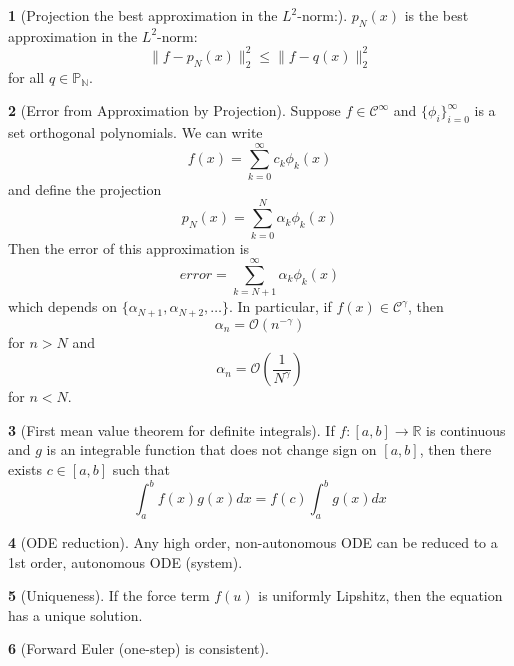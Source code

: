 \documentclass[12pt]{article}
\theoremstyle{definition}
\newtheorem{theorem}{\color{ForestGreen}{\textbf{Theorem}}}
\newcommand{\R}{\mathbb{R}}
\newcommand{\norm}[1]{\lVert#1\rVert}
\begin{document}
\begin{theorem}[Projection the best approximation in the $L^2$-norm:]
$p_N(x)$ is the best approximation in the $L^2$-norm:
\begin{equation}
\norm{f-p_N(x)}^2_2 \leq \norm{f-q(x)}^2_2
\end{equation}
for all $q \in \mathbb{P_N}$.
\end{theorem}

\begin{theorem}[Error from Approximation by Projection]
Suppose $f \in \mathcal{C}^\infty$ and $\{\phi_i\}_{i=0}^{\infty}$ is a set orthogonal polynomials. We can write
\begin{equation}
f(x) = \sum_{k=0}^\infty c_k \phi_k(x)
\end{equation}
and define the projection
\begin{equation}
p_N(x) = \sum_{k=0}^N \alpha_k \phi_k(x)
\end{equation}
Then the error of this approximation is
\begin{equation}
error = \sum_{k=N+1}^\infty \alpha_k \phi_k(x)
\end{equation}
which depends on $\{\alpha_{N+1}, \alpha_{N+2}, \ldots \}$. In particular, if $f(x) \in \mathcal{C}^\gamma$, then
\begin{equation}
\alpha_n = \mathcal{O}(n^{-\gamma})
\end{equation}
for $n > N$ and
\begin{equation}
\alpha_n = \mathcal{O}\left(\frac{1}{N^\gamma}\right)
\end{equation}
for $n < N$.
\end{theorem}

\begin{theorem}[First mean value theorem for definite integrals]
If $f:[a,b] \to \R$ is continuous and $g$ is an integrable function that does not change sign on $[a,b]$, then there exists $c \in [a,b]$ such that
\begin{equation}
\int_a^b f(x)g(x) dx = f(c)\int_a^b g(x)dx
\end{equation}
\end{theorem}

\begin{theorem}[ODE reduction]
Any high order, non-autonomous ODE can be reduced to a 1st order, autonomous ODE (system).
\end{theorem}

\begin{theorem}[Uniqueness]
If the force term $f(u)$ is uniformly Lipshitz, then the equation has a unique solution.
\end{theorem}

\begin{theorem}[Forward Euler (one-step) is consistent]
\end{theorem}
\end{document}
